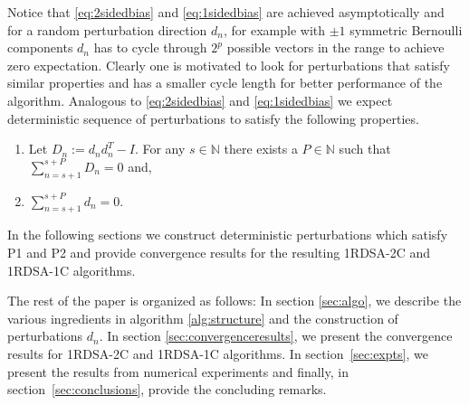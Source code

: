 \documentclass[letterpaper, 10 pt, conference]{ieeeconf}  %
\begin{document}
Notice that \eqref{eq:2sidedbias} and \eqref{eq:1sidedbias} are achieved asymptotically and 
for a random perturbation direction $d_n$, for example with $\pm 1$ symmetric Bernoulli 
components $d_n$ has to cycle through $2^p$ possible vectors in the range to achieve zero
expectation. Clearly one is motivated to look for perturbations that satisfy similar 
properties and has a smaller cycle length for better performance of the algorithm. 
Analogous to \eqref{eq:2sidedbias} and \eqref{eq:1sidedbias} we expect deterministic sequence 
of perturbations to satisfy the following properties.
\begin{enumerate}[label=\textbf{P\arabic*}.]
  \item Let $D_n:=d_nd_n^T-I.$ For any $s \in \mathbb{N}$ there exists a 
  $P \in \mathbb{N}$ such that $\sum\limits_{n=s+1}^{s+P}D_n=0$ and,
  \item  $\sum\limits_{n=s+1}^{s+P}d_n=0.$
\end{enumerate}
In the following sections we construct deterministic perturbations which satisfy P1 and P2
and provide convergence results for the resulting 1RDSA-2C and 1RDSA-1C algorithms.

The rest of the paper is organized as follows: In section \ref{sec:algo}, we
describe the various ingredients in algorithm \ref{alg:structure} and the construction
of perturbations $d_n$.
In section \ref{sec:convergenceresults}, 
we present the convergence results for 1RDSA-2C and 1RDSA-1C algorithms.
In section~\ref{sec:expts}, we present the results from numerical experiments and finally, 
in section~\ref{sec:conclusions}, provide the concluding remarks.
\end{document}
